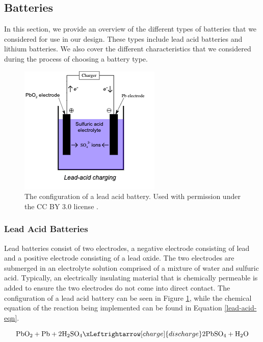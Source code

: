 \subsection{Batteries}
In this section, we provide an overview of the different types of batteries that we considered for use in our design. These types include lead acid batteries and lithium batteries. We also cover the different characteristics that we considered during the process of choosing a battery type.

\begin{figure}
    \centering
    \includegraphics[scale=1]{figures/lead-acid-battery.png}
    \caption{The configuration of a lead acid battery. Used with permission under the CC BY 3.0 license \cite{Lead-Acid-Charging}.}
    \label{lead-acid-battery} 
\end{figure}

\subsubsection{Lead Acid Batteries}
Lead batteries consist of two electrodes, a negative electrode consisting of lead and a positive electrode consisting of a lead oxide. The two electrodes are submerged in an electrolyte solution comprised of a mixture of water and sulfuric acid. Typically, an electrically insulating material that is chemically permeable is added to ensure the two electrodes do not come into direct contact. The configuration of a lead acid battery can be seen in Figure \ref{lead-acid-battery}, while the chemical equation of the reaction being implemented can be found in Equation \ref{lead-acid-eqn}.

\begin{equation}
    \text{PbO}_2 + \text{Pb} + 2\text{H}_2\text{SO}_4
    \xLeftrightarrow[charge]{discharge}
    2\text{PbSO}_4 + \text{H}_2\text{O}
    \label{lead-acid-eqn}
\end{equation}


